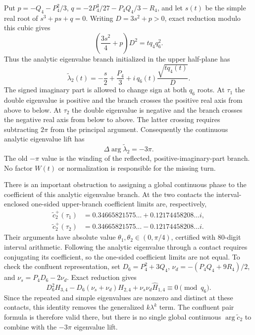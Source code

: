 \documentclass[11pt]{article}
\begin{document}
Put $p=-Q_4-P_4^2/3$, $q=-2P_4^3/27-P_4Q_4/3-R_4$, and let $s(t)$
be the simple real root of $s^3+ps+q=0$. Writing
$D=3s^2+p>0$, exact reduction modulo this cubic gives
\[
 \left(\frac{3s^2}{4}+p\right)D^2=tq_4q_6^2.
\]
Thus the analytic eigenvalue branch initialized in the upper half-plane
has
\[
 \widetilde\lambda_2(t)
 =-\frac{s}{2}+\frac{P_4}{3}
   +i\,q_6(t)\frac{\sqrt{tq_4(t)}}{D}.
\]
The signed imaginary part is allowed to change sign at both $q_6$ roots.
At $\tau_1$ the double eigenvalue is positive and the branch crosses
the positive real axis from above to below. At $\tau_2$ the double
eigenvalue is negative and the branch crosses the negative real axis
from below to above. The latter crossing requires subtracting $2\pi$
from the principal argument. Consequently the continuous analytic
eigenvalue lift has
\[
 \Delta\arg\widetilde\lambda_2=-3\pi.
\]
The old $-\pi$ value is the winding of the reflected,
positive-imaginary-part branch. No factor $W(t)$ or normalization is
responsible for the missing turn.

There is an important obstruction to assigning a global continuous
phase to the coefficient of this analytic eigenvalue branch. At the
two contacts the interval-enclosed one-sided upper-branch coefficient
limits are,
respectively,
\[
 \begin{aligned}
 \widetilde c_2^+(\tau_1)
  &=0.34665821575\ldots+0.12174458208\ldots i,\\
 \widetilde c_2^+(\tau_2)
  &=0.34665821575\ldots-0.12174458208\ldots i.
 \end{aligned}
\]
Their arguments have absolute value
$\theta_1,\theta_2\in(0,\pi/4)$, certified with 80-digit interval
arithmetic. Following the analytic eigenvalue through a contact
requires conjugating its coefficient, so the one-sided coefficient
limits are not equal. To check the confluent representation, set
$D_6=P_4^2+3Q_4$, $\nu_d=-(P_4Q_4+9R_4)/2$, and
$\nu_s=P_4D_6-2\nu_d$. Exact reduction gives
\[
 D_6^2H_{3,4}-D_6(\nu_s+\nu_d)H_{2,4}
       +\nu_s\nu_d \widehat H_{1,4}\equiv0\pmod{q_6}.
\]
Since the repeated and simple eigenvalues are nonzero and distinct at
these contacts, this identity removes the generalized $k\lambda^k$
term. The confluent pair formula is therefore valid there, but there
is no single global continuous $\arg\widetilde c_2$ to combine with the
$-3\pi$ eigenvalue lift.
\end{document}
